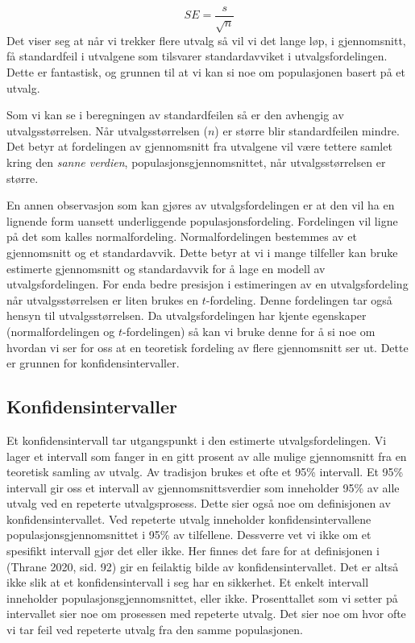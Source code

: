 \documentclass[
  letterpaper,
  DIV=11,
  numbers=noendperiod,
  oneside]{scrreprt}
\begin{document}
\[SE = \frac{s}{\sqrt{n}}\] Det viser seg at når vi trekker flere utvalg
så vil vi det lange løp, i gjennomsnitt, få standardfeil i utvalgene som
tilsvarer standardavviket i utvalgsfordelingen. Dette er fantastisk, og
grunnen til at vi kan si noe om populasjonen basert på et utvalg.

Som vi kan se i beregningen av standardfeilen så er den avhengig av
utvalgsstørrelsen. Når utvalgsstørrelsen (\(n\)) er større blir
standardfeilen mindre. Det betyr at fordelingen av gjennomsnitt fra
utvalgene vil være tettere samlet kring den \emph{sanne verdien},
populasjonsgjennomsnittet, når utvalgsstørrelsen er større.

En annen observasjon som kan gjøres av utvalgsfordelingen er at den vil
ha en lignende form uansett underliggende populasjonsfordeling.
Fordelingen vil ligne på det som kalles normalfordeling.
Normalfordelingen bestemmes av et gjennomsnitt og et standardavvik.
Dette betyr at vi i mange tilfeller kan bruke estimerte gjennomsnitt og
standardavvik for å lage en modell av utvalgsfordelingen. For enda bedre
presisjon i estimeringen av en utvalgsfordeling når utvalgsstørrelsen er
liten brukes en \(t\)-fordeling. Denne fordelingen tar også hensyn til
utvalgsstørrelsen. Da utvalgsfordelingen har kjente egenskaper
(normalfordelingen og \(t\)-fordelingen) så kan vi bruke denne for å si
noe om hvordan vi ser for oss at en teoretisk fordeling av flere
gjennomsnitt ser ut. Dette er grunnen for konfidensintervaller.

\hypertarget{konfidensintervaller}{%
\subsection{Konfidensintervaller}\label{konfidensintervaller}}

Et konfidensintervall tar utgangspunkt i den estimerte
utvalgsfordelingen. Vi lager et intervall som fanger in en gitt prosent
av alle mulige gjennomsnitt fra en teoretisk samling av utvalg. Av
tradisjon brukes et ofte et 95\% intervall. Et 95\% intervall gir oss et
intervall av gjennomsnittsverdier som inneholder 95\% av alle utvalg ved
en repeterte utvalgsprosess. Dette sier også noe om definisjonen av
konfidensintervallet. Ved repeterte utvalg inneholder
konfidensintervallene populasjonsgjennomsnittet i 95\% av tilfellene.
Dessverre vet vi ikke om et spesifikt intervall gjør det eller ikke. Her
finnes det fare for at definisjonen i (Thrane 2020, sid.
92)
gir en feilaktig bilde av konfidensintervallet. Det er altså ikke slik
at et konfidensintervall i seg har en sikkerhet. Et enkelt intervall
inneholder populasjonsgjennomsnittet, eller ikke. Prosenttallet som vi
setter på intervallet sier noe om prosessen med repeterte utvalg. Det
sier noe om hvor ofte vi tar feil ved repeterte utvalg fra den samme
populasjonen.
\end{document}
